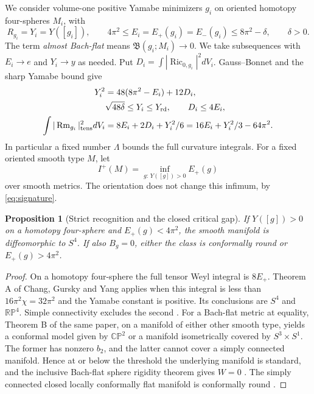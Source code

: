 \documentclass[11pt]{article}
\numberwithin{equation}{section}
\newtheorem{proposition}[theorem]{Proposition}
\theoremstyle{definition}
\theoremstyle{remark}
\newcommand{\Ric}{\operatorname{Ric}}
\newcommand{\Rm}{\operatorname{Rm}}
\newcommand{\Bach}{\mathfrak B}
\newcommand{\Yrd}{Y_{\mathrm{rd}}}
\begin{document}
We consider volume-one positive Yamabe minimizers \(g_i\) on
oriented homotopy four-spheres \(M_i\), with
\begin{equation}\label{eq:band}
 R_{g_i}=Y_i=Y([g_i]),\qquad
 4\pi^2\le E_i=E_+(g_i)=E_-(g_i)\le 8\pi^2-\delta,\qquad \delta>0.
\end{equation}
The term \emph{almost Bach-flat} means \(\Bach(g_i;M_i)\to0\).
We take subsequences with \(E_i\to e\) and \(Y_i\to y\) as needed.
Put \(D_i=\int |\Ric_{0,g_i}|^2dV_i\).
Gauss--Bonnet and the sharp Yamabe bound give
\begin{align}
 Y_i^2&=48(8\pi^2-E_i)+12D_i,\\
 &\sqrt{48\delta}\le Y_i\le\Yrd,\qquad D_i\le4E_i,\\
 \int|\Rm_{g_i}|^2_{\rm tens}dV_i
 &=8E_i+2D_i+Y_i^2/6=16E_i+Y_i^2/3-64\pi^2.
 \label{eq:budgets}
\end{align}
In particular a fixed number \(\Lambda\) bounds the full curvature
integrals. For a fixed oriented smooth type \(M\), let
\[
 I^+(M)=\inf_{g:\,Y([g])>0} E_+(g)
\]
over smooth metrics. The orientation does not change this infimum,
by \eqref{eq:signature}.

\begin{proposition}[Strict recognition and the closed critical gap]
\label{thm:closed-gap}
If \(Y([g])>0\) on a homotopy four-sphere and \(E_+(g)<4\pi^2\),
the smooth manifold is diffeomorphic to \(S^4\). If also \(B_g=0\),
either the class is conformally round or \(E_+(g)>4\pi^2\).
\end{proposition}
\begin{proof}
On a homotopy four-sphere the full tensor Weyl integral is \(8E_+\).
Theorem A of Chang, Gursky and Yang applies when this integral is
less than \(16\pi^2\chi=32\pi^2\) and the Yamabe constant is positive.
Its conclusions are \(S^4\) and \(\mathbb{RP}^4\). Simple connectivity
excludes the second \cite[Theorem A and Remark 2]{ChangGurskyYang2003}.
For a Bach-flat metric at equality, Theorem B of the same paper, on
a manifold of either other smooth type, yields a conformal model
given by \(\mathbb{CP}^2\) or a manifold isometrically covered by
\(S^3\times S^1\). The former has nonzero \(b_2\), and the latter
cannot cover a simply connected manifold. Hence at or below the
threshold the underlying manifold is standard, and the inclusive
Bach-flat sphere rigidity theorem gives \(W=0\)
\cite[Remark 2 and Theorem 2.1]{ChangChen2021RicciSphere}.
The simply connected closed locally conformally flat manifold
is conformally round \cite{Kuiper1949}.
\end{proof}
\end{document}

